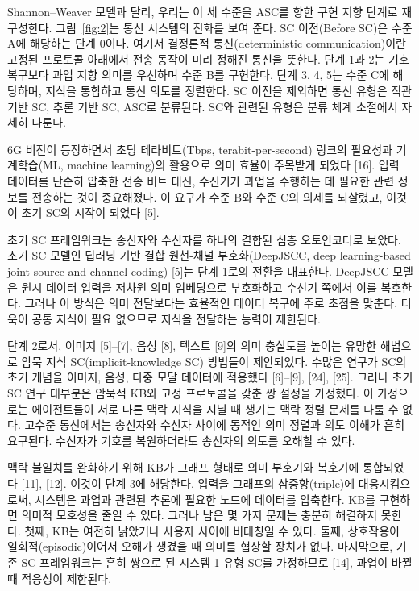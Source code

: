 Shannon--Weaver 모델과 달리, 우리는 이 세 수준을 ASC를 향한 구현 지향 단계로 재구성한다. 그림~\ref{fig:2}는 통신 시스템의 진화를 보여 준다. SC 이전(Before SC)은 수준 A에 해당하는 단계 0이다. 여기서 결정론적 통신(deterministic communication)이란 고정된 프로토콜 아래에서 전송 동작이 미리 정해진 통신을 뜻한다. 단계 1과 2는 기호 복구보다 과업 지향 의미를 우선하며 수준 B를 구현한다. 단계 3, 4, 5는 수준 C에 해당하며, 지식을 통합하고 통신 의도를 정렬한다. SC 이전을 제외하면 통신 유형은 직관 기반 SC, 추론 기반 SC, ASC로 분류된다. SC와 관련된 유형은 분류 체계 소절에서 자세히 다룬다.

6G 비전이 등장하면서 초당 테라비트(Tbps, terabit-per-second) 링크의 필요성과 기계학습(ML, machine learning)의 활용으로 의미 효율이 주목받게 되었다 [16]. 입력 데이터를 단순히 압축한 전송 비트 대신, 수신기가 과업을 수행하는 데 필요한 관련 정보를 전송하는 것이 중요해졌다. 이 요구가 수준 B와 수준 C의 의제를 되살렸고, 이것이 초기 SC의 시작이 되었다 [5].

초기 SC 프레임워크는 송신자와 수신자를 하나의 결합된 심층 오토인코더로 보았다. 초기 SC 모델인 딥러닝 기반 결합 원천-채널 부호화(DeepJSCC, deep learning-based joint source and channel coding) [5]는 단계 1로의 전환을 대표한다. DeepJSCC 모델은 원시 데이터 입력을 저차원 의미 임베딩으로 부호화하고 수신기 쪽에서 이를 복호한다. 그러나 이 방식은 의미 전달보다는 효율적인 데이터 복구에 주로 초점을 맞춘다. 더욱이 공통 지식이 필요 없으므로 지식을 전달하는 능력이 제한된다.

단계 2로서, 이미지 [5]--[7], 음성 [8], 텍스트 [9]의 의미 충실도를 높이는 유망한 해법으로 암묵 지식 SC(implicit-knowledge SC) 방법들이 제안되었다. 수많은 연구가 SC의 초기 개념을 이미지, 음성, 다중 모달 데이터에 적용했다 [6]--[9], [24], [25]. 그러나 초기 SC 연구 대부분은 암묵적 KB와 고정 프로토콜을 갖춘 쌍 설정을 가정했다. 이 가정으로는 에이전트들이 서로 다른 맥락 지식을 지닐 때 생기는 맥락 정렬 문제를 다룰 수 없다. 고수준 통신에서는 송신자와 수신자 사이에 동적인 의미 정렬과 의도 이해가 흔히 요구된다. 수신자가 기호를 복원하더라도 송신자의 의도를 오해할 수 있다.

맥락 불일치를 완화하기 위해 KB가 그래프 형태로 의미 부호기와 복호기에 통합되었다 [11], [12]. 이것이 단계 3에 해당한다. 입력을 그래프의 삼중항(triple)에 대응시킴으로써, 시스템은 과업과 관련된 추론에 필요한 노드에 데이터를 압축한다. KB를 구현하면 의미적 모호성을 줄일 수 있다. 그러나 남은 몇 가지 문제는 충분히 해결하지 못한다. 첫째, KB는 여전히 낡았거나 사용자 사이에 비대칭일 수 있다. 둘째, 상호작용이 일회적(episodic)이어서 오해가 생겼을 때 의미를 협상할 장치가 없다. 마지막으로, 기존 SC 프레임워크는 흔히 쌍으로 된 시스템 1 유형 SC를 가정하므로 [14], 과업이 바뀔 때 적응성이 제한된다.

